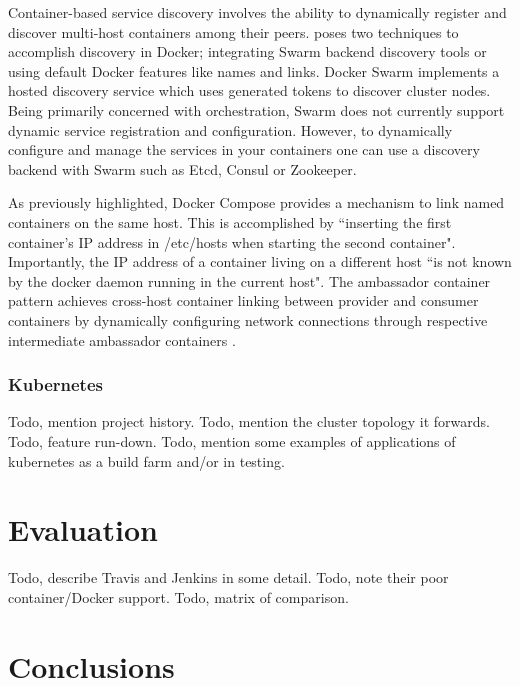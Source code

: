 \documentclass{report}
\begin{document}
\par 
Container-based service discovery involves the ability to dynamically register and discover multi-host containers among their peers. \citet{holla} poses two techniques to accomplish discovery in Docker; integrating Swarm backend discovery tools or using default Docker features like names and links. Docker Swarm implements a hosted discovery service which uses generated tokens to discover cluster nodes. Being primarily concerned with orchestration, Swarm does not currently support dynamic service registration and configuration. However, to dynamically configure and manage the services in your containers one can use a discovery backend with Swarm such as Etcd, Consul or Zookeeper. 
\par
As previously highlighted, Docker Compose provides a mechanism to link named containers on the same host. This is accomplished by ``inserting the first container's IP address in /etc/hosts when starting the second container". Importantly, the IP address of a container living on a different host ``is not known by the docker daemon running in the current host". The ambassador container pattern achieves cross-host container linking between provider and consumer containers by dynamically configuring network connections through respective intermediate ambassador containers \citep{holla}.

\subsubsection{Kubernetes}
Todo, mention project history. Todo, mention the cluster topology it forwards. Todo, feature run-down. Todo, mention some examples of applications of kubernetes as a build farm and/or in testing.
\lipsum[1] 

\section{Evaluation}
Todo, describe Travis and Jenkins in some detail. Todo, note their poor container/Docker support. Todo, matrix of comparison.
\lipsum[1] 

\section{Conclusions}
\lipsum[1-2] 

\vspace{-7.5mm}
\renewcommand{\refname}{\section{References}}


\end{document}
